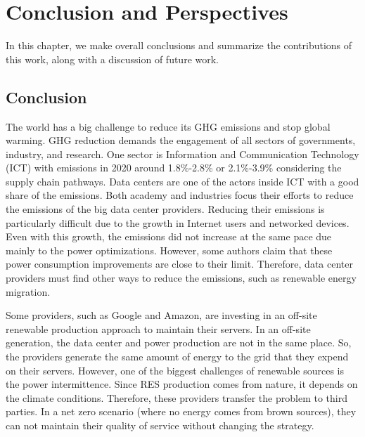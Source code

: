 \chapter{Conclusion and Perspectives}
\label{cha:conclusion}

In this chapter, we make overall conclusions and summarize the contributions of this work, along with a discussion of future work.

\section{Conclusion}

The world has a big challenge to reduce its GHG emissions and stop global warming. GHG reduction demands the engagement of all sectors of governments, industry, and research. One sector is Information and Communication Technology (ICT) with emissions in 2020 around 1.8\%-2.8\% or 2.1\%-3.9\% considering the supply chain pathways. Data centers are one of the actors inside ICT with a good share of the emissions. Both academy and industries focus their efforts to reduce the emissions of the big data center providers. Reducing their emissions is particularly difficult due to the growth in Internet users and networked devices. Even with this growth, the emissions did not increase at the same pace due mainly to the power optimizations. However, some authors claim that these power consumption improvements are close to their limit. Therefore, data center providers must find other ways to reduce the emissions, such as renewable energy migration.

Some providers, such as Google and Amazon, are investing in an off-site renewable production approach to maintain their servers. In an off-site generation, the data center and power production are not in the same place. So, the providers generate the same amount of energy to the grid that they expend on their servers. However, one of the biggest challenges of renewable sources is the power intermittence. Since RES production comes from nature, it depends on the climate conditions. Therefore, these providers transfer the problem to third parties. In a net zero scenario (where no energy comes from brown sources), they can not maintain their quality of service without changing the strategy. 

